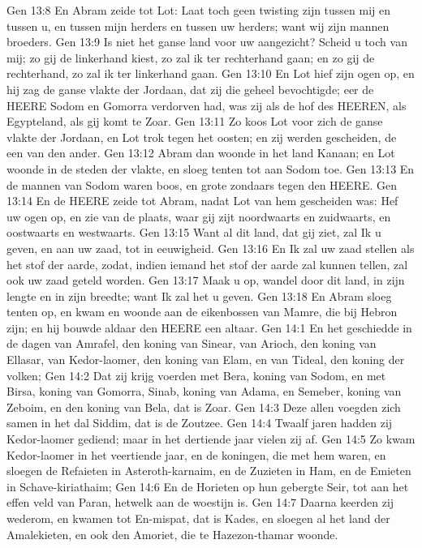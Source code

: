 Gen 13:8  En Abram zeide tot Lot: Laat toch geen twisting zijn tussen mij en tussen u, en tussen mijn herders en tussen uw herders; want wij zijn mannen broeders.
Gen 13:9  Is niet het ganse land voor uw aangezicht? Scheid u toch van mij; zo gij de linkerhand kiest, zo zal ik ter rechterhand gaan; en zo gij de rechterhand, zo zal ik ter linkerhand gaan.
Gen 13:10  En Lot hief zijn ogen op, en hij zag de ganse vlakte der Jordaan, dat zij die geheel bevochtigde; eer de HEERE Sodom en Gomorra verdorven had, was zij als de hof des HEEREN, als Egypteland, als gij komt te Zoar.
Gen 13:11  Zo koos Lot voor zich de ganse vlakte der Jordaan, en Lot trok tegen het oosten; en zij werden gescheiden, de een van den ander.
Gen 13:12  Abram dan woonde in het land Kanaan; en Lot woonde in de steden der vlakte, en sloeg tenten tot aan Sodom toe.
Gen 13:13  En de mannen van Sodom waren boos, en grote zondaars tegen den HEERE.
Gen 13:14  En de HEERE zeide tot Abram, nadat Lot van hem gescheiden was: Hef uw ogen op, en zie van de plaats, waar gij zijt noordwaarts en zuidwaarts, en oostwaarts en westwaarts.
Gen 13:15  Want al dit land, dat gij ziet, zal Ik u geven, en aan uw zaad, tot in eeuwigheid.
Gen 13:16  En Ik zal uw zaad stellen als het stof der aarde, zodat, indien iemand het stof der aarde zal kunnen tellen, zal ook uw zaad geteld worden.
Gen 13:17  Maak u op, wandel door dit land, in zijn lengte en in zijn breedte; want Ik zal het u geven.
Gen 13:18  En Abram sloeg tenten op, en kwam en woonde aan de eikenbossen van Mamre, die bij Hebron zijn; en hij bouwde aldaar den HEERE een altaar.
Gen 14:1  En het geschiedde in de dagen van Amrafel, den koning van Sinear, van Arioch, den koning van Ellasar, van Kedor-laomer, den koning van Elam, en van Tideal, den koning der volken;
Gen 14:2  Dat zij krijg voerden met Bera, koning van Sodom, en met Birsa, koning van Gomorra, Sinab, koning van Adama, en Semeber, koning van Zeboim, en den koning van Bela, dat is Zoar.
Gen 14:3  Deze allen voegden zich samen in het dal Siddim, dat is de Zoutzee.
Gen 14:4  Twaalf jaren hadden zij Kedor-laomer gediend; maar in het dertiende jaar vielen zij af.
Gen 14:5  Zo kwam Kedor-laomer in het veertiende jaar, en de koningen, die met hem waren, en sloegen de Refaieten in Asteroth-karnaim, en de Zuzieten in Ham, en de Emieten in Schave-kiriathaim;
Gen 14:6  En de Horieten op hun gebergte Seir, tot aan het effen veld van Paran, hetwelk aan de woestijn is.
Gen 14:7  Daarna keerden zij wederom, en kwamen tot En-mispat, dat is Kades, en sloegen al het land der Amalekieten, en ook den Amoriet, die te Hazezon-thamar woonde.
